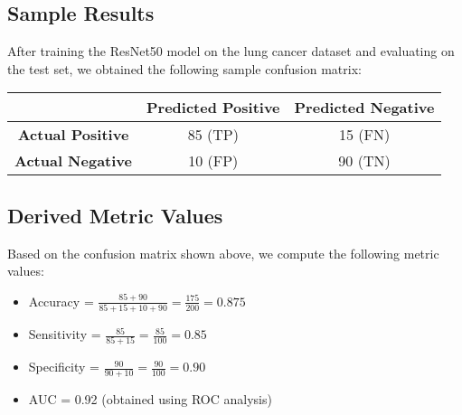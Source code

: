 
\subsection{Sample Results}

After training the ResNet50 model on the lung cancer dataset and evaluating on the test set, we 
obtained the following sample confusion matrix:

\begin{table}[H]
    \centering
    \begin{tabular}{|c|c|c|}
        \hline
        \textbf{} & \textbf{Predicted Positive} & \textbf{Predicted Negative} \\
        \hline
        \textbf{Actual Positive} & 85 (TP) & 15 (FN) \\
        \hline
        \textbf{Actual Negative} & 10 (FP) & 90 (TN) \\
        \hline
    \end{tabular}
\end{table}


\subsection{Derived Metric Values}

Based on the confusion matrix shown above, we compute the following metric values:

\begin{itemize}
    \item Accuracy = $\frac{85 + 90}{85 + 15 + 10 + 90} = \frac{175}{200} = 0.875$
    \item Sensitivity = $\frac{85}{85 + 15} = \frac{85}{100} = 0.85$
    \item Specificity = $\frac{90}{90 + 10} = \frac{90}{100} = 0.90$
    \item AUC = 0.92 (obtained using ROC analysis)
\end{itemize}

